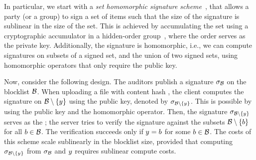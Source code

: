 \iffalse 
In particular, we start with a \emph{set homomorphic signature scheme}~\cite{johnson2002homomorphic}, that allows 
a party (or a group) to sign a set of items such that the size of the signature is sublinear in the size of the set. This is achieved by accumulating the set using a cryptographic accumulator in a hidden-order group~\cite{baric1997collision}, where the order serves as the private key. 
Additionally, the signature is homomorphic, i.e., we can compute signatures on subsets of a signed set, and the union of two 
signed sets, using  homomorphic operators that only require the public key. 

Now, consider the following design. The auditors publish a signature $\genericSig[\blocklist]$ on the blocklist $\blocklist$. 
When uploading a file with content hash \genericCInputElmt, the client computes the signature on $\blocklist \setminus \{\genericCInputElmt\}$ using the public key, denoted by $\genericSig[\blocklist \setminus \{\genericCInputElmt\}]$. This is possible by using the public key and the homomorphic operator. Then, the signature $\genericSig[\blocklist \setminus \{\genericCInputElmt\}]$ serves as the \contentToken; the server tries to verify the signature against the subsets $\blocklist \setminus \{ \genericBlocklistElmt \}$ for all $\genericBlocklistElmt \in \blocklist$. The verification succeeds only if $\genericCInputElmt = \genericBlocklistElmt$ for some $\genericBlocklistElmt \in \blocklist$. 
The costs of this scheme scale sublinearly in the blocklist size, provided that computing $\genericSig[\blocklist \setminus \{\genericCInputElmt\}]$ from 
$\genericSig[\blocklist]$ and $\genericCInputElmt$ requires sublinear compute costs.  






